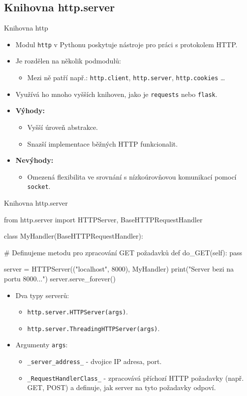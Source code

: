 \documentclass{beamer}
\begin{document}
\subsection{Knihovna http.server}
\begin{frame}{Knihovna http}
	\begin{itemize}
		\item Modul \texttt{http} v Pythonu poskytuje nástroje pro práci s protokolem HTTP.
		\item Je rozdělen na několik podmodulů:
		\begin{itemize}
			\item Mezi ně patří např.: \texttt{http.client}, \texttt{http.server}, \texttt{http.cookies} \ldots
		\end{itemize}
		\item Využívá ho mnoho vyšších knihoven, jako je \texttt{requests} nebo \texttt{flask}.
		\item \textbf{Výhody:}
		\begin{itemize}
			\item Vyšší úroveň abstrakce.
			\item Snazší implementace běžných HTTP funkcionalit.
		\end{itemize}
		\item \textbf{Nevýhody:}
		\begin{itemize}
			\item Omezená flexibilita ve srovnání s nízkoúrovňovou komunikací pomocí \texttt{socket}.
		\end{itemize}
	\end{itemize}	
\end{frame}
\begin{frame}{Knihovna http.server}

	from http.server import HTTPServer, BaseHTTPRequestHandler

	class MyHandler(BaseHTTPRequestHandler):

		# Definujeme metodu pro zpracování GET požadavků
		def do_GET(self):
			pass

	server = HTTPServer(("localhost", 8000), MyHandler)
	print("Server bezi na portu 8000...")
	server.serve_forever()

	\begin{itemize}
		\item Dva typy serverů:
		\begin{itemize}
			\item \texttt{http.server.HTTPServer(args)}.
			\item \texttt{http.server.ThreadingHTTPServer(args)}.
		\end{itemize}
		\item Argumenty \texttt{args}:
		\begin{itemize}
			\item \texttt{_server_address_} - dvojice IP adresa, port.
			\item \texttt{_RequestHandlerClass_} - zpracovává příchozí HTTP požadavky (např. GET, POST) a definuje, jak server na tyto požadavky odpoví.
		\end{itemize}
	\end{itemize}	
\end{frame}
\end{document}
